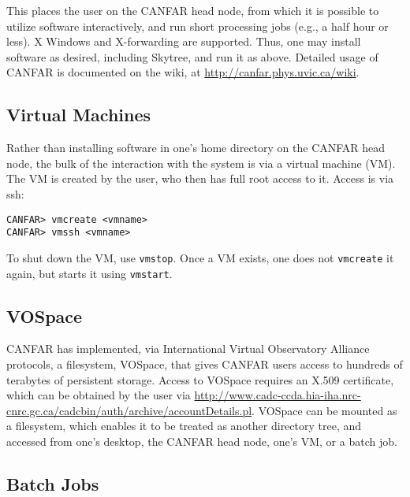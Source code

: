 This places the user on the CANFAR head node, from which it is possible to utilize software interactively, and run short processing jobs (e.g., a half hour or less). X Windows and X-forwarding are supported. Thus, one may install software as desired, including Skytree, and run it as above. Detailed usage of CANFAR is documented on the wiki, at \url{http://canfar.phys.uvic.ca/wiki}.

\subsection{Virtual Machines}

Rather than installing software in one's home directory on the CANFAR head node, the bulk of the interaction with the system is via a virtual machine (VM). The VM is created by the user, who then has full root access to it. Access is via ssh:

\begin{verbatim}
CANFAR> vmcreate <vmname>
CANFAR> vmssh <vmname>
\end{verbatim}

\noindent To shut down the VM, use {\tt vmstop}. Once a VM exists, one does not {\tt vmcreate} it again, but starts it using {\tt vmstart}.

\subsection{VOSpace}

CANFAR has implemented, via International Virtual Observatory Alliance protocols, a filesystem, VOSpace, that gives CANFAR users access to hundreds of terabytes of persistent storage. Access to VOSpace requires an X.509 certificate, which can be obtained by the user via \url{http://www.cadc-ccda.hia-iha.nrc-cnrc.gc.ca/cadcbin/auth/archive/accountDetails.pl}. VOSpace can be mounted as a filesystem, which enables it to be treated as another directory tree, and accessed from one's desktop, the CANFAR head node, one's VM, or a batch job.

\subsection{Batch Jobs}


